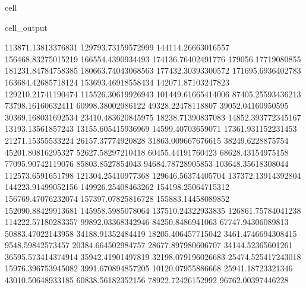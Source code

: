 \documentclass[letterpaper,10pt,english]{jupyterBook}
\begin{document}
\begin{sphinxuseclass}{cell}
\begin{sphinxVerbatimOutput}
\begin{sphinxuseclass}{cell_output}
\begin{sphinxVerbatim}[commandchars=\\\{\}]
113871.13813376831  129793.73159572999  144114.26663016557  156468.83275015219  166554.4390934493  174136.76402491776  179056.17719080855  181231.84784758385  180663.74043068563  177432.30393300572  171695.6936402783  163684.42685718124  153693.46918558434  142071.87103247823  129210.21741190474  115526.30619926943  101449.61665414006  87405.25593436213  73798.16160632411  60998.38002986122  49328.22478118807  39052.04160950595  30369.168031692534  23410.483620845975  18238.71390837083  14852.393772345167  13193.13561857243  13155.605415936969  14599.40703659071  17361.931152231453  21271.15355533224  26157.37774920828  31863.009667676615  38249.6228875754  45201.80816295327  52627.58297210418  60455.44191760423  68628.43154975158  77095.90742119076  85803.8527854043  94684.78728905853  103648.35618308044  112573.6591651798  121304.25410977368  129646.56374405704  137372.13914392804  144223.91499052156  149926.25408463262  154198.25064715312  156769.47076232074  157397.07825816728  155883.14458089852  152090.88429913681  145958.5985078064  137510.24322933835  126861.75784041238  114222.57180283357  99892.03368342946  84250.8486941063  67747.94306089813  50883.47022143958  34188.91352484419  18205.406457715042  3461.4746694308415  \PYGZhy{}9548.59842573457  \PYGZhy{}20384.664502984757  \PYGZhy{}28677.897980606707  \PYGZhy{}34144.52365601261  \PYGZhy{}36595.573414374914  \PYGZhy{}35942.41901497819  \PYGZhy{}32198.079196026683  \PYGZhy{}25474.525417243018  \PYGZhy{}15976.396753945082  \PYGZhy{}3991.670894857205  10120.07955886668  25941.18723321346  43010.50648933185  60838.56182352156  78922.72426152992  96762.00397446228  

\end{sphinxVerbatim}
\end{sphinxuseclass}
\end{sphinxVerbatimOutput}
\end{sphinxuseclass}
\end{document}
